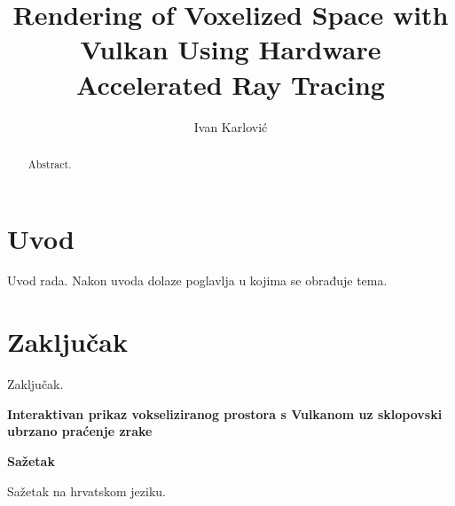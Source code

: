 \documentclass[times, utf8, zavrsni]{fer}
\begin{document}

\title{Rendering of Voxelized Space with Vulkan Using Hardware Accelerated Ray Tracing}

\author{Ivan Karlović}

\maketitle

\izvornik

\zahvala{}

\tableofcontents

\chapter{Uvod}
Uvod rada. Nakon uvoda dolaze poglavlja u kojima se obrađuje tema.

\chapter{Zaključak}
Zaključak.




\newpage
\vspace*{\fill}
\thispagestyle{empty}
\begin{center}
  {\bf Interaktivan prikaz vokseliziranog prostora s Vulkanom uz sklopovski ubrzano praćenje zrake}
\end{center}
\hspace*{\fill} {\bf Sa\v{z}etak} \hspace*{\fill} \par
\vspace*{25pt}

Sažetak na hrvatskom jeziku.


\begin{abstract}
Abstract.

\end{abstract}
\end{document}
